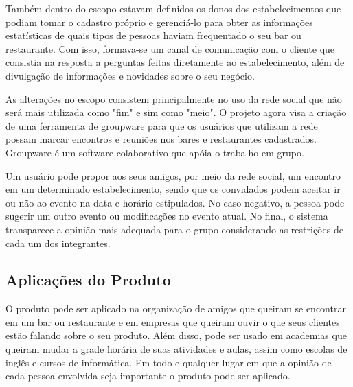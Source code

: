     Também dentro do escopo estavam definidos os donos dos estabelecimentos que podiam tomar o cadastro próprio e gerenciá-lo para obter as informações estatísticas de quais tipos de pessoas haviam frequentado o seu bar ou restaurante. Com isso, formava-se um canal de comunicação com o cliente que consistia na resposta a perguntas feitas diretamente ao estabelecimento, além de divulgação de informações e novidades sobre o seu negócio.
 
    As alterações no escopo consistem principalmente no uso da rede social que não será mais utilizada como "fim" e sim como "meio". O projeto agora visa a criação de uma ferramenta de groupware para que os usuários que utilizam a rede possam marcar encontros e reuniões nos bares e restaurantes cadastrados. Groupware é um software colaborativo que apóia o trabalho em grupo.

    Um usuário pode propor aos seus amigos, por meio da rede social, um encontro em um determinado estabelecimento, sendo que os convidados podem aceitar ir ou não ao evento na data e horário estipulados. No caso negativo, a pessoa pode sugerir um outro evento ou modificações no evento atual. No final, o sistema transparece a opinião mais adequada para o grupo considerando as restrições de cada um dos integrantes.
 
\subsection{Aplicações do Produto}

    O produto pode ser aplicado na organização de amigos que queiram se encontrar em um bar ou restaurante e em empresas que queiram ouvir o que seus clientes estão falando sobre o seu produto. Além disso, pode ser usado em academias que queiram mudar a grade horária de suas atividades e aulas, assim como escolas de inglês e cursos de informática. Em todo e qualquer lugar em que a opinião de cada pessoa envolvida seja importante o produto pode ser aplicado. 

